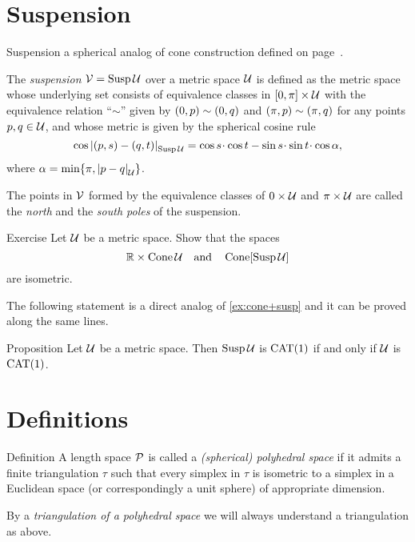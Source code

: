 \section{Suspension}

Suspension a spherical analog of cone construction defined on page~\pageref{page:cone}.

The \emph{suspension} $\mathcal{V}=\mathop{\rm Susp}\nolimits\mathcal{U}$ over a metric space $\mathcal{U}$
is defined as the metric space whose underlying set consists of equivalence classes in
$[0,\pi]\times \mathcal{U}$ with the equivalence relation ``$\sim$'' given by $(0,p)\z\sim (0,q)$ and $(\pi,p)\z\sim (\pi,q)$ for any points $p,q\in\mathcal{U}$,
and whose metric is given by the  spherical cosine rule
\[
\cos\dist{(p,s)}{(q,t)}{\Susp\spc{U}} 
=
\cos s\cdot\cos t-\sin s\cdot\sin t\cdot\cos\alpha,
\]
where $\alpha= \min\{\pi, \dist{p}{q}{\spc{U}}\}$.

The points in $\mathcal{V}$ formed by the equivalence classes of $0\times\mathcal{U}$ and $\pi\times\mathcal{U}$ are called  the \emph{north} and the  \emph{south poles} of the suspension.

\begin{thm}{Exercise}\label{ex:product-cone}
Let $\mathcal{U}$ be a metric space.
Show that the spaces 
\[\mathbb{R}\times \mathop{\rm Cone}\nolimits\mathcal{U}\quad\text{and}\quad\mathop{\rm Cone}\nolimits[\mathop{\rm Susp}\nolimits\mathcal{U}]\]
are  isometric.
\end{thm}

The following statement is a direct analog of \ref{ex:cone+susp} and it can be proved along the same lines.

\begin{thm}{Proposition}\label{prop:susp}
Let $\mathcal{U}$ be a metric space.
Then $\mathop{\rm Susp}\nolimits\mathcal{U}$ is  $\mathrm{CAT}(1)$ if and only if $\mathcal{U}$ is $\mathrm{CAT}(1)$.
\end{thm}


\section{Definitions}

\begin{thm}{Definition}\label{def:poly}
A length space $\mathcal{P}$ is called  
a \emph{(spherical) polyhedral space} 
if it admits a finite triangulation $\tau$ 
such that every simplex in $\tau$ is isometric to a simplex in a Euclidean space (or correspondingly a unit sphere) of appropriate dimension.

By a 
\emph{triangulation of a polyhedral space} 
we will always understand a triangulation as above. 
\end{thm}

